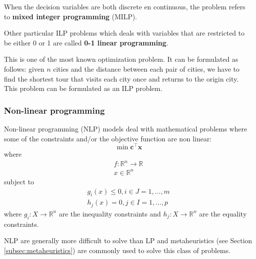 When the decision variables are both discrete en continuous, the problem refers to \textbf{mixed integer programming} (MILP).

Other particular ILP problems which deals with variables that are restricted to be either 0 or 1 are called \textbf{0-1 linear programming}.

\begin{example}
This is one of the most known optimization problem. It can be formulated as follows: given $n$ cities and the distance between each pair of cities, we have to find the shortest tour that visits each city once and returns to the origin city. This problem can be formulated as an ILP problem.
\end{example}

\subsubsection{Non-linear programming}
Non-linear programming (NLP) models deal with mathematical problems where some of the constraints and/or the objective function are non linear:
\begin{equation}
\min \mathbf{c}^\intercal\mathbf{x}
\end{equation}
where
\begin{equation*}
\begin{gathered}
f: \mathbb{R}^n \rightarrow \mathbb{R}\\
x \in \mathbb{R}^n
\end{gathered}
\end{equation*}
subject to
\begin{equation*}
\begin{gathered}
g_i(x) \leq 0, i \in J = 1, \dots, m\\
h_j(x) = 0, j \in I = 1, \dots, p
\end{gathered}
\end{equation*}
where $g_i : X \rightarrow \mathbb{R}^n$ are the inequality constraints and $h_j : X \rightarrow \mathbb{R}^n$ are the equality constraints.

NLP are generally more difficult to solve than LP \cite{talbi09} and metaheuristics (see Section \ref{subsec:metaheuristics}) are commonly used to solve this class of problems.




